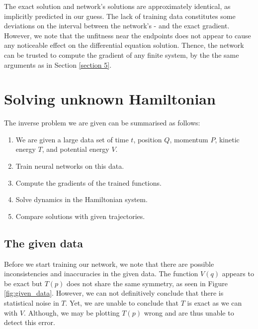 \documentclass{article}
\begin{document}
The exact solution and network's solutions are approximately identical, as implicitly predicted in our guess. The lack of training data constitutes some deviations on the interval between the network's - and the exact gradient. However, we note that the unfitness near the endpoints does not appear to cause any noticeable effect on the differential equation solution. Thence, the network can be trusted to compute the gradient of any finite system, by the the same arguments as in Section \ref{section 5}. 

\newpage
\section{Solving unknown Hamiltonian}
The inverse problem we are given can be summarised as follows: 
\begin{enumerate}
    \item We are given a large data set of time $t$, position $Q$, momentum $P$, kinetic energy $T$, and potential energy $V$.
    \item Train neural networks on this data.
    \item Compute the gradients of the trained functions.
    \item Solve dynamics in the Hamiltonian system.
    \item Compare solutions with given trajectories.
\end{enumerate}

\subsection{The given data}
Before we start training our network, we note that there are possible inconsistencies and inaccuracies in the given data. The function $V(q)$ appears to be exact but $T(p)$ does not share the same symmetry, as seen in Figure \ref{fig:given_data}. However, we can not definitively conclude that there is statistical noise in $T$. Yet, we are unable to conclude that $T$ is exact as we can with $V$. Although, we may be plotting $T(p)$ wrong and are thus unable to detect this error.
\end{document}

